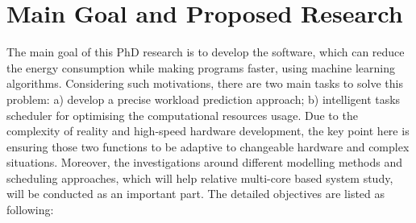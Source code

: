\section{Main Goal and Proposed Research}

The main goal of this PhD research is to develop the software, which can reduce the energy consumption while making programs faster, using machine learning algorithms. Considering such motivations, there are two main tasks to solve this problem: a) develop a precise workload prediction approach; b) intelligent tasks scheduler for optimising the computational resources usage. Due to the complexity of reality and high-speed hardware development, the key point here is ensuring those two functions to be adaptive to changeable hardware and complex situations. Moreover, the investigations around different modelling methods and scheduling approaches, which will help relative multi-core based system study, will be conducted as an important part. The detailed objectives are listed as following:
